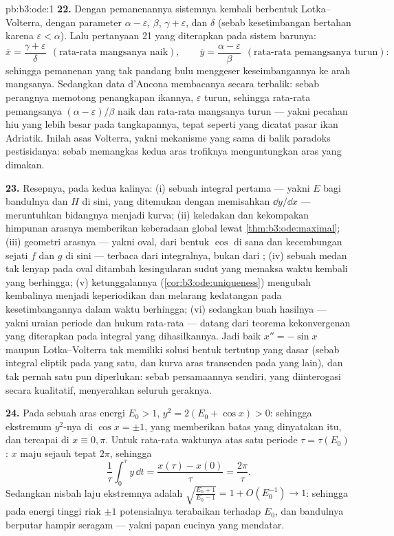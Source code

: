 \begin{solution}{pb:b3:ode:1}
\textbf{22.} Dengan pemanenannya sistemnya kembali berbentuk
Lotka--Volterra, dengan parameter $\alpha -
\varepsilon$, $\beta$, $\gamma + \varepsilon$, dan $\delta$ (sebab
kesetimbangan  bertahan karena $\varepsilon <
\alpha$). Lalu pertanyaan 21 yang diterapkan pada sistem barunya:
\[
\bar x = \frac{\gamma + \varepsilon}{\delta}
\ \ (\text{rata-rata mangsanya naik}),
\qquad
\bar y = \frac{\alpha - \varepsilon}{\beta}
\ \ (\text{rata-rata pemangsanya turun}) :
\]
sehingga pemanenan yang tak pandang bulu menggeser keseimbangannya ke arah
mangsanya. Sedangkan data d'Ancona membacanya secara terbalik: sebab perangnya memotong
penangkapan ikannya, $\varepsilon$ turun, sehingga rata-rata pemangsanya
$(\alpha - \varepsilon)/\beta$ naik dan rata-rata mangsanya
turun --- yakni pecahan hiu yang lebih besar pada tangkapannya, tepat seperti yang
dicatat pasar ikan Adriatik. Inilah asas Volterra,
yakni mekanisme yang sama di balik paradoks pestisidanya:
sebab memangkas kedua aras trofiknya menguntungkan aras yang dimakan.

\textbf{23.} Resepnya, pada kedua kalinya: (i) sebuah integral pertama
--- yakni $E$ bagi bandulnya dan $H$ di sini, yang ditemukan dengan memisahkan
$\dd y/\dd x$ --- meruntuhkan bidangnya menjadi kurva; (ii)
keledakan dan kekompakan himpunan arasnya memberikan keberadaan
global lewat \cref{thm:b3:ode:maximal}; (iii)
geometri arasnya --- yakni oval, dari bentuk $\cos$
di sana dan kecembungan sejati $f$ dan $g$ di sini --- terbaca
dari integralnya, bukan dari ; (iv) sebuah medan tak lenyap
pada oval  ditambah kesingularan sudut yang 
memaksa waktu kembali yang berhingga; (v) ketunggalannya
(\cref{cor:b3:ode:uniqueness}) mengubah kembalinya menjadi
keperiodikan dan melarang kedatangan pada kesetimbangannya dalam waktu berhingga;
(vi) sedangkan buah hasilnya --- yakni uraian periode dan hukum rata-rata
--- datang dari teorema kekonvergenan yang diterapkan pada
integral yang dihasilkannya. Jadi baik $x'' = -\sin x$ maupun
Lotka--Volterra tak memiliki solusi bentuk tertutup yang dasar
(sebab integral eliptik pada yang satu, dan kurva aras transenden
pada yang lain), dan tak pernah satu pun diperlukan: sebab persamaannya
sendiri, yang diinterogasi secara kualitatif, menyerahkan seluruh
geraknya.

\textbf{24.} Pada sebuah aras energi $E_0 > 1$, $y^2 = 2(E_0 +
\cos x) > 0$: sehingga ekstremum $y^2$-nya di $\cos x = \pm1$, yang memberikan
batas yang dinyatakan itu, dan tercapai di $x \equiv 0, \pi$. Untuk rata-rata
waktunya atas satu periode $\tau = \tau(E_0)$: $x$ maju sejauh
tepat $2\pi$, sehingga
\[
\frac1\tau\int_0^\tau y\,\dd t = \frac{x(\tau) -
x(0)}{\tau} = \frac{2\pi}\tau .
\]
Sedangkan nisbah laju ekstremnya adalah $\sqrt{\frac{E_0 + 1}{E_0 -
1}} = 1 + O(E_0^{-1}) \to 1$: sehingga pada energi tinggi riak
$\pm1$ potensialnya terabaikan terhadap $E_0$, dan bandulnya
berputar hampir seragam --- yakni papan cucinya yang mendatar.


\end{solution}

